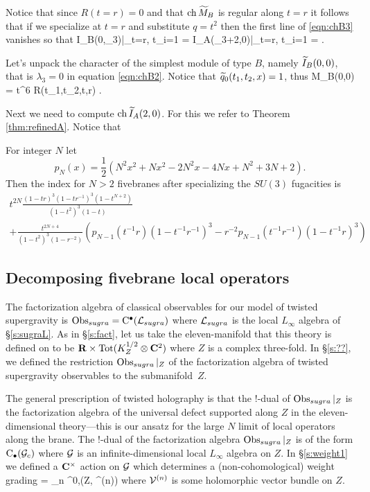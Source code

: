 \documentclass[11pt]{amsart}
\begin{document}
Notice that since $R(t=r) = 0$ and that $\operatorname{ch} \widetilde M_B$ is regular along $t=r$ it follows that if we specialize at $t = r$ and substitute $q = t^2$ then the first line of \eqref{eqn:chB3} vanishes so that
\beqn
\ch \til I_B(0,\lambda_3)|_{t=r, t_i=1} = \ch \til I_A(\lambda_3+2,0)|_{t=r, t_i=1} =  .
\eeqn

\parsec[s:Bfirstcase]

Let's unpack the character of the simplest module of type $B$, namely $\widetilde I_B(0,0)$, that is $\lambda_3 = 0$ in equation \ref{eqn:chB2}.
Notice that $\widetilde q_0 (t_1,t_2,x) = 1$, thus
\beqn
\ch \til M_B(0,0) = t^6 R(t_1,t_2,t,r) .
\eeqn

Next we need to compute $\operatorname{ch} \widetilde I_A(2, 0)$.
For this we refer to Theorem \ref{thm:refinedA}.
Notice that 


\parsec[s:typeBunrefinedKR]


For integer $N$ let 
\[
p_{N}(x) = \frac12 \left(N^2 x^2 + N x^2 - 2N^2x -4 N x + N^2 + 3N +2\right) .
\]
Then the index for $N > 2$ fivebranes after specializing the $SU(3)$ fugacities is
\begin{multline}
t^{2 N} \frac{(1-tr)^3 (1-tr^{-1})^3 (1-t^{N+2})}{(1-t^2)^3(1 - t)} \\ + \frac{t^{2N + 4}}{(1-t^2)^3 (1-r^{-2})} \left(p_{N-1} (t^{-1} r) (1 - t^{-1} r^{-1})^3 - r^{-2} p_{N-1}(t^{-1} r^{-1})(1-t^{-1}r)^3 \right) 
\end{multline}

\subsection{Decomposing fivebrane local operators}
\label{s:kacfivebrane}

The factorization algebra of classical observables for our model of twisted supergravity is $\operatorname{Obs}_{sugra} = {\rm C}^\bullet(\mathcal L_{sugra})$ where $\mathcal L_{sugra}$ is the local $L_\infty$ algebra of \S\ref{s:sugraL}. 
As in \S\ref{s:fact}, let us take the eleven-manifold that this theory is defined on to be $\mathbf{R} \times {\rm Tot}(K^{1/2}_Z \otimes \mathbf{C}^2)$ where $Z$ is a complex three-fold.
In \S\ref{s:??}, we defined the restriction $\operatorname{Obs}_{sugra}|_{Z}$ of the factorization algebra of twisted supergravity observables to the submanifold~$Z$.

The general prescription of twisted holography is that the $!$-dual of $\operatorname{Obs}_{sugra}|_Z$ is the factorization algebra of the universal defect supported along $Z$ in the eleven-dimensional theory---this is our ansatz for the large $N$ limit of local operators along the brane.
The $!$-dual of the factorization algebra $\operatorname{Obs}_{sugra}|_Z$ is of the form ${\rm C}_\bullet (\mathcal G_c)$ where $\mathcal G$ is an infinite-dimensional local $L_\infty$ algebra on $Z$.
In \S \ref{s:weight1} we defined a $\mathbf{C}^\times$ action on $\mathcal G$ which determines a (non-cohomological) weight grading
\beqn\label{eqn:decomp2a}
\cG = \bigoplus_{n } \Omega^{0,\bu}(Z, \cV^{(n)}) 
\eeqn
where $\mathcal V^{(n)}$ is some holomorphic vector bundle on $Z$.
\end{document}
